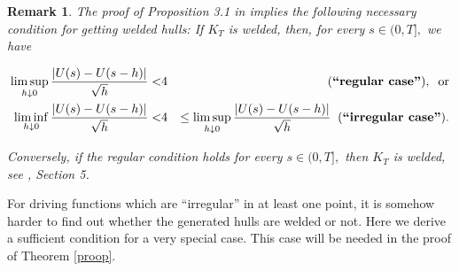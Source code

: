 \documentclass[11pt]{amsart}
\numberwithin{equation}{section}
\theoremstyle{plain}
\newtheorem{remark}[theorem]{Remark}
\theoremstyle{definition}
\begin{document}
 

\begin{remark} The proof of Proposition 3.1 in \cite{MR2920433} implies the following necessary condition for getting welded hulls:
 If $K_T$ is welded, then, for every $s\in(0,T],$ we have

{ \small \begin{eqnarray*}
 \limsup_{h\downarrow0}\frac{|U(s)-U(s-h)|}{\sqrt{h}}<& 4& \quad \;\;(\text{\bf ``regular case''}), \;\; \text{or}    \\     
 \liminf_{h\downarrow0}\frac{|U(s)-U(s-h)|}{\sqrt{h}} <& 4& \leq \limsup_{h\downarrow0}\frac{|U(s)-U(s-h)|}{\sqrt{h}} \;\;({\text{\bf ``irregular  case''}}). \end{eqnarray*} }

Conversely, if the regular condition holds for every $s\in(0,T],$ then $K_T$ is welded, see \cite{Lind:2005}, Section 5.
\end{remark}

For driving functions which are ``irregular'' in at least one point, it is somehow harder to find out whether the generated hulls are welded or not. Here we derive a sufficient condition for a very special case. This case will be needed in the proof of Theorem \ref{proop}.
\end{document}
